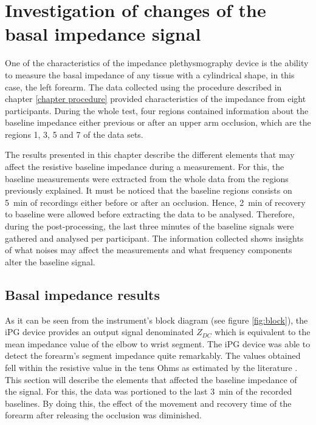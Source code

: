 
\chapter{Investigation of changes of the basal impedance signal}  %
\label{chapter basal}

\ifpdf
\graphicspath{{Chapter6/Figs/Raster/}{Chapter6/Figs/PDF/}{Chapter6/Figs/}}
\else
\graphicspath{{Chapter6/Figs/Vector/}{Chapter6/Figs/}}
\fi

One of the characteristics of the impedance plethysmography device is the ability to measure the basal impedance of any tissue with a cylindrical shape, in this case, the left forearm. The data collected using the procedure described in chapter \ref{chapter procedure} provided characteristics of the impedance from eight participants. During the whole test, four regions contained information about the baseline impedance either previous or after an upper arm occlusion, which are the regions 1, 3, 5 and 7 of the data sets. 

The results presented in this chapter describe the different elements that may affect the resistive baseline impedance during a measurement. For this, the baseline measurements were extracted from the whole data from the regions previously explained. It must be noticed that the baseline regions consists on \SI{5}{\minute} of recordings either before or after an occlusion. Hence, \SI{2}{\minute} of recovery to baseline were allowed before extracting the data to be analysed. Therefore, during the post-processing, the last three minutes of the baseline signals were gathered and analysed per participant. The information collected shows insights of what noises may affect the measurements and what frequency components alter the baseline signal. 

\section{Basal impedance results}
\label{section basal 1}
As it can be seen from the instrument's block diagram (see figure \ref{fig:block}), the iPG device provides an output signal denominated $Z_{DC}$ which is equivalent to the mean impedance value of the elbow to wrist segment. The iPG device was able to detect the forearm's segment impedance quite remarkably. The values obtained fell within the resistive value in the tens Ohms as estimated by the literature \cite{dai2009vivo, faes1999electric, grimnes1983impedance}. This section will describe the elements that affected the baseline impedance of the signal. For this, the data was portioned to the last \SI{3}{\minute} of the recorded baselines. By doing this, the effect of the movement and recovery time of the forearm after releasing the occlusion was diminished. 

